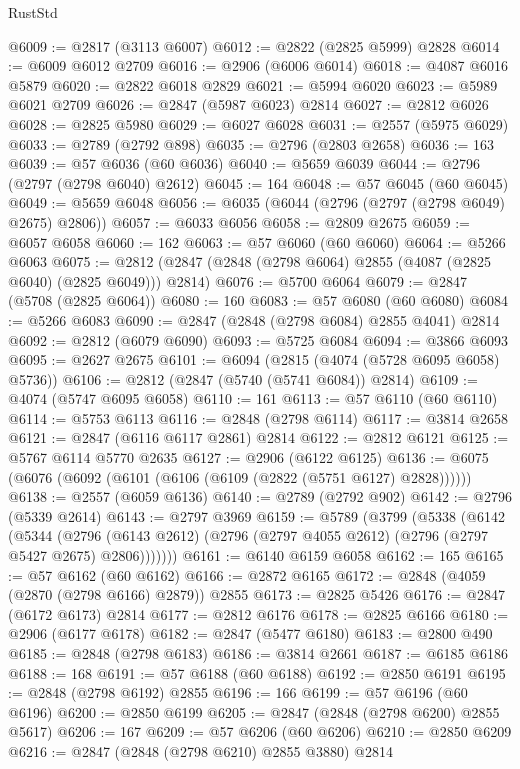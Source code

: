 \begin{lexlean}{RustStd}
\begin{coremodule}
@6009 := @2817 (@3113 @6007)
@6012 := @2822 (@2825 @5999) @2828
@6014 := @6009 @6012 @2709
@6016 := @2906 (@6006 @6014)
@6018 := @4087 @6016 @5879
@6020 := @2822 @6018 @2829
@6021 := @5994 @6020
@6023 := @5989 @6021 @2709
@6026 := @2847 (@5987 @6023) @2814
@6027 := @2812 @6026
@6028 := @2825 @5980
@6029 := @6027 @6028
@6031 := @2557 (@5975 @6029)
@6033 := @2789 (@2792 @898)
@6035 := @2796 (@2803 @2658)
@6036 := 163
@6039 := @57 @6036 (@60 @6036)
@6040 := @5659 @6039
@6044 := @2796 (@2797 (@2798 @6040) @2612)
@6045 := 164
@6048 := @57 @6045 (@60 @6045)
@6049 := @5659 @6048
@6056 := @6035 (@6044 (@2796 (@2797 (@2798 @6049) @2675) @2806))
@6057 := @6033 @6056
@6058 := @2809 @2675
@6059 := @6057 @6058
@6060 := 162
@6063 := @57 @6060 (@60 @6060)
@6064 := @5266 @6063
@6075 := @2812 (@2847 (@2848 (@2798 @6064) @2855 (@4087 (@2825 @6040) (@2825 @6049))) @2814)
@6076 := @5700 @6064
@6079 := @2847 (@5708 (@2825 @6064))
@6080 := 160
@6083 := @57 @6080 (@60 @6080)
@6084 := @5266 @6083
@6090 := @2847 (@2848 (@2798 @6084) @2855 @4041) @2814
@6092 := @2812 (@6079 @6090)
@6093 := @5725 @6084
@6094 := @3866 @6093
@6095 := @2627 @2675
@6101 := @6094 (@2815 (@4074 (@5728 @6095 @6058) @5736))
@6106 := @2812 (@2847 (@5740 (@5741 @6084)) @2814)
@6109 := @4074 (@5747 @6095 @6058)
@6110 := 161
@6113 := @57 @6110 (@60 @6110)
@6114 := @5753 @6113
@6116 := @2848 (@2798 @6114)
@6117 := @3814 @2658
@6121 := @2847 (@6116 @6117 @2861) @2814
@6122 := @2812 @6121
@6125 := @5767 @6114 @5770 @2635
@6127 := @2906 (@6122 @6125)
@6136 := @6075 (@6076 (@6092 (@6101 (@6106 (@6109 (@2822 (@5751 @6127) @2828))))))
@6138 := @2557 (@6059 @6136)
@6140 := @2789 (@2792 @902)
@6142 := @2796 (@5339 @2614)
@6143 := @2797 @3969
@6159 := @5789
    (@3799
      (@5338
        (@6142
          (@5344
            (@2796 (@6143 @2612) (@2796 (@2797 @4055 @2612) (@2796 (@2797 @5427 @2675) @2806)))))))
@6161 := @6140 @6159 @6058
@6162 := 165
@6165 := @57 @6162 (@60 @6162)
@6166 := @2872 @6165
@6172 := @2848 (@4059 (@2870 (@2798 @6166) @2879)) @2855
@6173 := @2825 @5426
@6176 := @2847 (@6172 @6173) @2814
@6177 := @2812 @6176
@6178 := @2825 @6166
@6180 := @2906 (@6177 @6178)
@6182 := @2847 (@5477 @6180)
@6183 := @2800 @490
@6185 := @2848 (@2798 @6183)
@6186 := @3814 @2661
@6187 := @6185 @6186
@6188 := 168
@6191 := @57 @6188 (@60 @6188)
@6192 := @2850 @6191
@6195 := @2848 (@2798 @6192) @2855
@6196 := 166
@6199 := @57 @6196 (@60 @6196)
@6200 := @2850 @6199
@6205 := @2847 (@2848 (@2798 @6200) @2855 @5617)
@6206 := 167
@6209 := @57 @6206 (@60 @6206)
@6210 := @2850 @6209
@6216 := @2847 (@2848 (@2798 @6210) @2855 @3880) @2814

\end{coremodule}
\end{lexlean}
